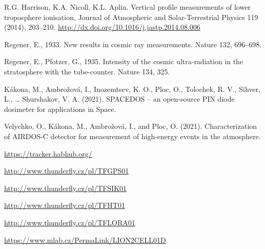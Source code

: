 \documentclass{Rpd}
\begin{document}
\begin{thebibliography}{99.}
 R.G. Harrison, K.A. Nicoll, K.L. Aplin. Vertical profile measurements of lower troposphere ionisation, Journal of Atmospheric and Solar-Terrestrial Physics 119 (2014), 203–210. \url{http://dx.doi.org/10.1016/j.jastp.2014.08.006}

 Regener, E., 1933. New results in cosmic ray measurements. Nature 132, 696–698.

 Regener, E., Pfotzer, G., 1935. Intensity of the cosmic ultra-radiation in the stratosphere with the tube-counter. Nature 134, 325.

 Kákona, M., Ambrožová, I., Inozemtsev, K. O., Ploc, O., Tolochek, R. V., Sihver, L., … Shurshakov, V. A. (2021). SPACEDOS – an open-source PIN diode dosimeter for applications in Space.

 Velychko, O., Kákona, M., Ambrožová, I., and Ploc, O. (2021). Characterization of AIRDOS-C detector for measurement of high-energy events in the atmosphere.

 \url{https://tracker.habhub.org/}

 \url{http://www.thunderfly.cz/pl/TFGPS01}

 \url{http://www.thunderfly.cz/pl/TFSIK01}

 \url{http://www.thunderfly.cz/pl/TFHT01}

 \url{http://www.thunderfly.cz/pl/TFLORA01}

 \url{https://www.mlab.cz/PermaLink/LION2CELL01D}



\end{thebibliography}
\end{document}
